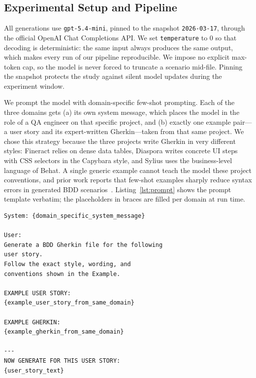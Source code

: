 \subsection{Experimental Setup and Pipeline}
\label{sec:pipeline}

All generations use \texttt{gpt-5.4-mini}, pinned to the snapshot
\texttt{2026-03-17}, through the official OpenAI Chat Completions API.
We set \texttt{temperature} to 0 so that decoding is deterministic: the
same input always produces the same output, which makes every run of
our pipeline reproducible. We impose no explicit max-token cap, so the
model is never forced to truncate a scenario mid-file. Pinning the
snapshot protects the study against silent model updates during the
experiment window.

We prompt the model with domain-specific few-shot prompting. Each of
the three domains gets (a) its own system message, which places the
model in the role of a QA engineer on that specific project, and (b)
exactly one example pair---a user story and its expert-written
Gherkin---taken from that same project. We chose this strategy because
the three projects write Gherkin in very different styles: Fineract
relies on dense data tables, Diaspora writes concrete UI steps with
CSS selectors in the Capybara style, and Sylius uses the
business-level language of Behat. A single generic example cannot
teach the model these project conventions, and prior work reports that
few-shot examples sharply reduce syntax errors in generated BDD
scenarios~\cite{karpurapu2024bddautomation}. Listing~\ref{lst:prompt} shows the
prompt template verbatim; the placeholders in braces are filled per
domain at run time.

\begin{lstlisting}[float=ht, basicstyle=\ttfamily\scriptsize, frame=tb, captionpos=b, aboveskip=1em, belowskip=1em, breaklines=true, columns=fullflexible, caption={Prompt template (verbatim). Placeholders in braces are instantiated per domain.},label={lst:prompt}]
System: {domain_specific_system_message}

User:
Generate a BDD Gherkin file for the following
user story.
Follow the exact style, wording, and
conventions shown in the Example.

EXAMPLE USER STORY:
{example_user_story_from_same_domain}

EXAMPLE GHERKIN:
{example_gherkin_from_same_domain}

---
NOW GENERATE FOR THIS USER STORY:
{user_story_text}
\end{lstlisting}


